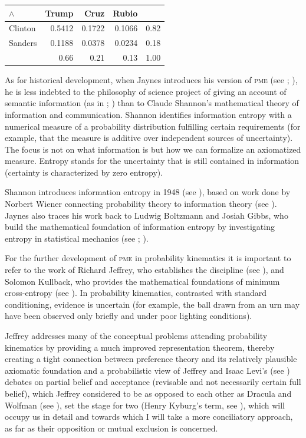 \documentclass[phd,12pt,oneside]{ubcthesis}
\begin{document}
\medskip

\begin{tabular}{|l|r|r|r|r|} \hline
  $\wedge$ & Trump & Cruz & Rubio & \\ \hline
  Clinton & 0.5412 & 0.1722 & 0.1066 & 0.82 \\ \hline
  Sanders & 0.1188 & 0.0378 & 0.0234 & 0.18 \\ \hline
  & 0.66 & 0.21 & 0.13 & 1.00 \\ \hline
\end{tabular}

\vspace{1cm}

As for historical development, when Jaynes introduces his version of
\textsc{pme} (see ; ), he
is less indebted to the philosophy of science project of giving an
account of semantic information (as in ;
) than to Claude Shannon's mathematical
theory of information and communication. Shannon identifies
information entropy with a numerical measure of a probability
distribution fulfilling certain requirements (for example, that the
measure is additive over independent sources of uncertainty). The
focus is not on what information is but how we can formalize an
axiomatized measure. Entropy stands for the uncertainty that is still
contained in information (certainty is characterized by zero entropy).

Shannon introduces information entropy in 1948 (see
), based on work done by Norbert Wiener
connecting probability theory to information theory (see
). Jaynes also traces his work back to Ludwig
Boltzmann and Josiah Gibbs, who build the mathematical foundation of
information entropy by investigating entropy in statistical mechanics
(see ; ).

For the further development of \textsc{pme} in probability
kinematics it is important to refer to the work of Richard Jeffrey,
who establishes the discipline (see ), and
Solomon Kullback, who provides the mathematical foundations of minimum
cross-entropy (see ). In probability
kinematics, contrasted with standard conditioning, evidence is
uncertain (for example, the ball drawn from an urn may have been
observed only briefly and under poor lighting conditions).

Jeffrey addresses many of the conceptual problems attending
probability kinematics by providing a much improved representation
theorem, thereby creating a tight connection between preference theory
and its relatively plausible axiomatic foundation and a probabilistic
view of  Jeffrey and Isaac Levi's (see
) debates on partial belief and acceptance
(revisable and not necessarily certain full belief), which Jeffrey
considered to be as opposed to each other as Dracula and Wolfman (see
), set the stage for two  (Henry Kyburg's term, see ),
which will occupy us in detail and towards which I will take a more
conciliatory approach, as far as their opposition or mutual exclusion
is concerned.
\end{document}
